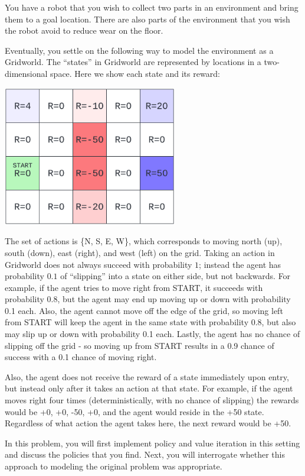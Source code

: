 \documentclass[submit]{../harvardml}
\begin{document}
\newpage

\begin{problem}

You have a robot that you wish to collect two parts in an environment
and bring them to a goal location.  There are also parts of the
environment that you wish the robot avoid to reduce wear on the floor.

Eventually, you settle on the following way to model the environment
as a Gridworld.  The ``states'' in Gridworld are represented by
locations in a two-dimensional space.  Here we show each state and its
reward:

\begin{center}
\includegraphics[width=3in]{img_input/gridworld.png}
\end{center}

The set of actions is \{N, S, E, W\}, which corresponds to moving north (up), south (down), east (right), and west (left) on the grid. Taking an action in Gridworld does not always succeed with probability
$1$; instead the agent has probability $0.1$ of ``slipping'' into a
state on either side, but not backwards.  For example, if the agent tries to move right from START, it succeeds with probability 0.8, but the agent may end up moving up or down with probability 0.1 each. Also, the agent cannot move off the edge of the grid, so moving left from START will keep the agent in the same state with probability 0.8, but also may slip up or down with probability 0.1 each. Lastly, the agent has no chance of slipping off the grid - so moving up from START results in a 0.9 chance of success with a 0.1 chance of moving right.

Also, the agent does not receive the reward of a state immediately upon entry, but instead only after it takes an action at that state. For example, if the agent moves right four times (deterministically, with no chance of slipping) the rewards would be +0, +0, -50, +0, and the agent would reside in the +50 state. Regardless of what action the agent takes here, the next reward would be +50.

In this problem, you will first implement policy and value iteration in this setting and discuss the policies that you find.  Next, you will interrogate whether this approach to modeling the original problem was appropriate.

\end{problem}
\newpage
\end{document}
